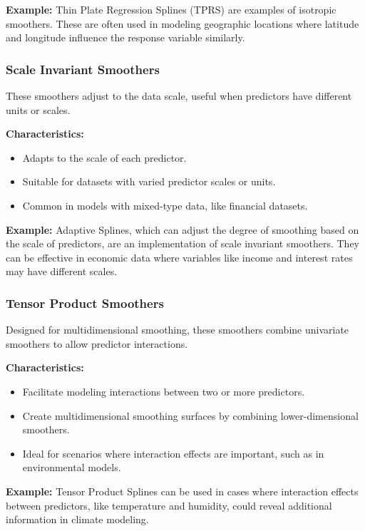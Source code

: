 \documentclass[12pt, twoside,hidelinks]{article}
\theoremstyle{definition}
\numberwithin{equation}{section}
\begin{document}
\textbf{Example:} Thin Plate Regression Splines (TPRS) are examples of isotropic smoothers. These are often used in modeling geographic locations where latitude and longitude influence the response variable similarly.

\subsubsection{Scale Invariant Smoothers}\label{sec:smooth:overview:scale}
These smoothers adjust to the data scale, useful when predictors have different units or scales.

\textbf{Characteristics:}
\begin{itemize}
    \item Adapts to the scale of each predictor.
    \item Suitable for datasets with varied predictor scales or units.
    \item Common in models with mixed-type data, like financial datasets.
\end{itemize}

\textbf{Example:} Adaptive Splines, which can adjust the degree of smoothing based on the scale of predictors, are an implementation of scale invariant smoothers. They can be effective in economic data where variables like income and interest rates may have different scales.

\subsubsection{Tensor Product Smoothers}\label{sec:smooth:overview:tensor}
Designed for multidimensional smoothing, these smoothers combine univariate smoothers to allow predictor interactions.

\textbf{Characteristics:}
\begin{itemize}
    \item Facilitate modeling interactions between two or more predictors.
    \item Create multidimensional smoothing surfaces by combining lower-dimensional smoothers.
    \item Ideal for scenarios where interaction effects are important, such as in environmental models.
\end{itemize}

\textbf{Example:} Tensor Product Splines can be used in cases where interaction effects between predictors, like temperature and humidity, could reveal additional information in climate modeling.
\end{document}
